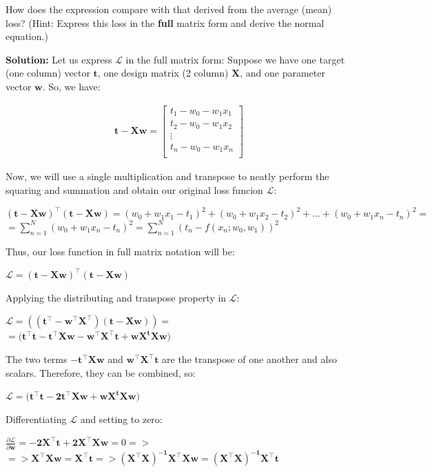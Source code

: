 \documentclass[10pt]{article}
\begin{document}
\begin{itemize}
How does the expression compare with that derived from the average (mean) loss?  (Hint: Express this loss in the {\bf full} matrix form and derive the normal equation.)

{\bf Solution:} Let us express $\mathcal{L} $ in the full matrix form: Suppose we have one target (one column) vector $\mathbf{t}$, one design matrix (2 column) $\mathbf{X}$, and one parameter vector $\mathbf{w}$. So, we have:

\begin{eqnarray*}
\mathbf{t - Xw}  = 
    \begin{bmatrix}
    t_{1} - w_{0}  - w_{1}x_{1}\\[0.3em]
    t_{2} - w_{0}  - w_{1}x_{2}\\[0.3em]
    \vdots \\[0.3em]
    t_{n} - w_{0}  - w_{1}x_{n}\\[0.3em]
    
    \end{bmatrix}
\end{eqnarray*}

Now, we will use a single multiplication and transpose to neatly perform the squaring and summation and obtain our original loss funcion $\mathcal{L}$:

$\mathbf{(t - Xw)}^\top \mathbf{(t - Xw)} = (w_{0} + w_{1}x_{1} -t_{1})^{2} + (w_{0} + w_{1}x_{2} -t_{2})^{2} + \hdots + 
(w_{0} + w_{1}x_{n} -t_{n})^{2} =$\\
$= \sum_{n=1}^N ( w_{0} + w_{1}x_{n} -t_{n})^2 = \sum_{n=1}^N (t_{n} - f(x_{n}; w_{0}, w_{1}))^2$  

Thus, our loss function in full matrix notation will be:

$\mathcal{L} = (\mathbf{t - Xw})^\top (\mathbf{t - Xw})$

Applying the distributing and transpose property in $\mathcal{L}$:

$\mathcal{L} = (\mathbf{(t^\top  - w^\top X^\top) (t - Xw)  }) = $ \\
$ = \mathbf{(t^{\top}t -t^{\top}Xw - w^{\top}X^{\top}t + wX^{t}Xw})$ 

The two terms $\mathbf{-t^{\top}Xw}$ and $\mathbf{ w^{\top}X^{\top}t}$ are the transpose of one another and also scalars. Therefore, 
they can be combined, so:

$\mathcal{L} = \mathbf{(t^{\top}t -2t^{\top}Xw  + wX^{t}Xw})$ 

Differentiating $\mathcal{L}$ and setting to zero:

 $\frac{\partial \mathcal{L}}{\partial \mathbf{w}} = \mathbf{-2X^{\top}t + 2X^{\top}Xw} = 0 =>$ \\
 $=>  \mathbf{X^{\top}Xw = X^{\top}t} => \mathbf{(X^{\top}X)^{-1} X^{\top}Xw = (X^{\top}X)^{-1} X^{\top}t}$
 

\end{itemize}
\end{document}
